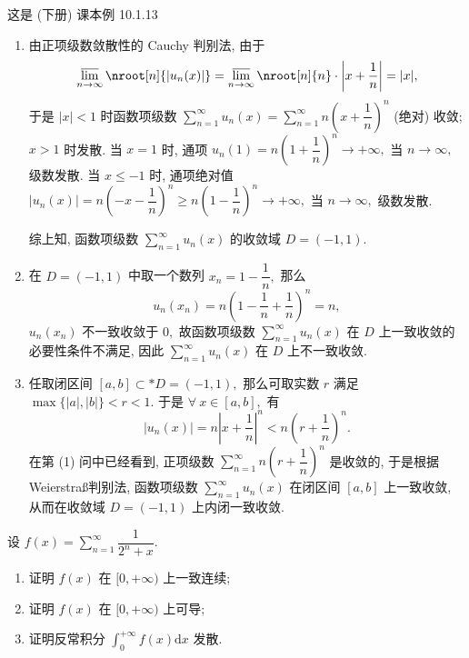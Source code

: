 \begin{solution}
这是 (下册) 课本例 10.1.13

\begin{enumerate}
\item 由正项级数敛散性的 Cauchy 判别法, 由于
$$\varlimsup_{n\to\infty} \nroot[n]{\lvert u_n(x) \rvert} = \varlimsup_{n\to\infty} \nroot[n]{n} \cdot \left\lvert x + \dfrac{1}{n} \right\rvert = \lvert x \rvert,$$
于是 $\lvert x \rvert < 1$ 时函数项级数 $\sum\limits_{n=1}^{\infty} u_n(x) = \sum\limits_{n=1}^{\infty} n \left( x + \dfrac{1}{n} \right)^n$ (绝对) 收敛; $x > 1$ 时发散. 当 $x = 1$ 时, 通项 $u_n(1) = n \left( 1 + \dfrac{1}{n} \right)^n \to +\infty,$ 当 $n \to \infty,$ 级数发散. 当 $x \leqslant -1$ 时, 通项绝对值 $\lvert u_n(x) \rvert = n \left( -x - \dfrac{1}{n} \right)^n \geqslant n \left( 1 - \dfrac{1}{n} \right)^n \to +\infty,$ 当 $n \to \infty,$ 级数发散.

综上知, 函数项级数 $\sum\limits_{n=1}^{\infty} u_n(x)$ 的收敛域 $D = (-1, 1).$
\item 在 $D = (-1, 1)$ 中取一个数列 $x_n = 1 - \dfrac{1}{n},$ 那么
$$u_n(x_n) = n \left( 1 - \dfrac{1}{n} + \dfrac{1}{n} \right)^n = n,$$
$u_n(x_n)$ 不一致收敛于 $0,$ 故函数项级数 $\sum\limits_{n=1}^{\infty} u_n(x)$ 在 $D$ 上一致收敛的必要性条件不满足, 因此 $\sum\limits_{n=1}^{\infty} u_n(x)$ 在 $D$ 上不一致收敛.
\item 任取闭区间 $[a, b] \subset* D = (-1, 1),$ 那么可取实数 $r$ 满足 $\max\{\lvert a \rvert, \lvert b \rvert\} < r < 1.$ 于是 $\forall ~ x \in [a, b],$ 有
$$\lvert u_n(x) \rvert = n \left\lvert x + \dfrac{1}{n} \right\rvert^n < n \left( r + \dfrac{1}{n} \right)^n.$$
在第 (1) 问中已经看到, 正项级数 $\sum\limits_{n=1}^{\infty} n \left( r + \dfrac{1}{n} \right)^n$ 是收敛的, 于是根据 Weierstra\ss 判别法, 函数项级数 $\sum\limits_{n=1}^{\infty} u_n(x)$ 在闭区间 $[a, b]$ 上一致收敛, 从而在收敛域 $D = (-1, 1)$ 上内闭一致收敛.
\end{enumerate}
\end{solution}

\begin{question}[points = 10]
设 $f(x) = \sum\limits_{n=1}^\infty \dfrac{1}{2^n + x}.$
\begin{enumerate}
\item 证明 $f(x)$ 在 $[0, +\infty)$ 上一致连续;
\item 证明 $f(x)$ 在 $[0, +\infty)$ 上可导;
\item 证明反常积分 $\int_0^{+\infty} f(x) \mathrm{d} x$ 发散.
\end{enumerate}

\end{question}

